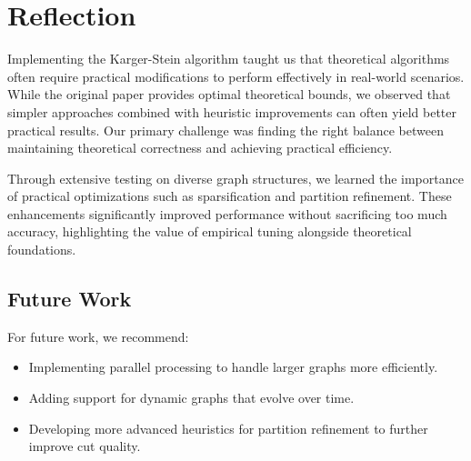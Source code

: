 \documentclass[11pt]{article}
\begin{document}



\section{Reflection}

Implementing the Karger-Stein algorithm taught us that theoretical algorithms often require practical modifications to perform effectively in real-world scenarios. While the original paper provides optimal theoretical bounds, we observed that simpler approaches combined with heuristic improvements can often yield better practical results. Our primary challenge was finding the right balance between maintaining theoretical correctness and achieving practical efficiency. 

Through extensive testing on diverse graph structures, we learned the importance of practical optimizations such as sparsification and partition refinement. These enhancements significantly improved performance without sacrificing too much accuracy, highlighting the value of empirical tuning alongside theoretical foundations.

\subsection{Future Work}

For future work, we recommend:
\begin{itemize}
    \item Implementing parallel processing to handle larger graphs more efficiently.
    \item Adding support for dynamic graphs that evolve over time.
    \item Developing more advanced heuristics for partition refinement to further improve cut quality.
\end{itemize}
\end{document}
